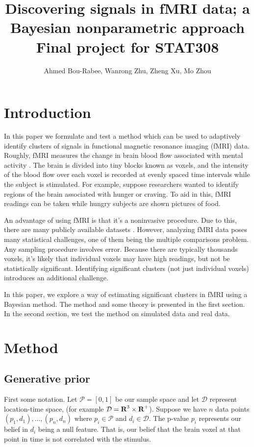 \documentclass[12pt]{article}
\title{Discovering signals in fMRI data; 
a Bayesian nonparametric approach   \\ \large{Final project for STAT308}}
\author{Ahmed Bou-Rabee, Wanrong Zhu, Zheng Xu, Mo Zhou}
\begin{document}
\maketitle

\section{Introduction} 

In this paper we formulate and test a method which can be used to adaptively identify 
clusters of signals in functional magnetic resonance imaging (fMRI) data. 
Roughly, fMRI measures the change in brain blood flow associated 
with mental activity \cite{huettel2004functional}. The brain is divided into tiny blocks known as voxels, and the intensity 
of the blood flow over each voxel is recorded at evenly spaced time intervals while the subject is stimulated. For example, suppose researchers wanted to identify regions 
of the brain associated with hunger or craving. To aid in this, fMRI readings can be taken while hungry subjects are shown pictures of food. 

An advantage of using fMRI is that it's a noninvasive procedure.  Due to this, there are many publicly available datasets \cite{poldrack2013toward}.
However, analyzing fMRI data poses many statistical challenges, one of them being the multiple comparisons problem. 
 Any sampling procedure involves error.  Because there are typically thousands voxels, it's likely that individual voxels 
 may have high readings, but not be statistically significant. Identifying significant clusters (not just individual voxels) introduces an additional challenge. 
 
 In this paper, we explore a way of estimating significant clusters in fMRI using a Bayesian method.  The method and some theory is presented in the first 
 section. In the second section, we test the method on simulated data and real data.

\section{Method}



\subsection{Generative prior}
First some notation. 
Let $\mathcal{P} = [0,1]$ be our sample space and let $\mathcal{D}$ represent location-time space, (for example $\mathcal{D} = {\mbox{\bf R}}^3 \times {\mbox{\bf R}}^+$).
Suppose we have $n$ data points $(p_1, d_1), \ldots, (p_n, d_n)$ where $p_i \in \mathcal{P}$ and $d_i \in \mathcal{D}$. 
The p-value $p_i$ represents our belief in $d_i$ being a null feature. That is, our belief that the brain voxel at that point in time is not correlated 
with the stimulus. 
\end{document}
